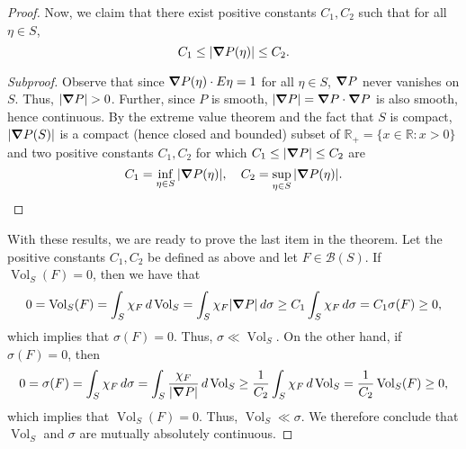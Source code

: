 \documentclass[11pt]{article}
\newcommand*{\myproofname}{Proof}
\newenvironment{subproof}[1][\myproofname]{\begin{proof}[#1]\renewcommand*{\qedsymbol}{$\mathbin{/\mkern-6mu/}$}}{\end{proof}}
\newcommand\R{\mathbb{R}}
\newcommand{\f}[2]{\frac{#1}{#2}}
\newcommand{\Vol}{\operatorname{Vol}}
\begin{document}
\begin{proof}
Now, we claim that there exist positive constants $C_1, C_2$ such that for all $\eta\in S$, 
\begin{equation*}
    C_1 \leq \abs{\grad P(\eta)} \leq C_2.
\end{equation*}
\begin{subproof}[Subproof]
Observe that since $\grad P(\eta) \cdot E\eta = 1$ for all $\eta\in S$, $\grad P$ never vanishes on $S$. Thus, $\abs{\grad P} > 0$. Further, since $P$ is smooth, $\abs{\grad P} = \grad P \cdot \grad P$ is also smooth, hence continuous. By the extreme value theorem and the fact that $S$ is compact, $\abs{\grad P(S) }$ is a compact (hence closed and bounded) subset of $\R_+ = \{ x \in \R : x > 0 \}$ and two positive constants $C_1,C_2$ for which $C_1 \leq \abs{\grad P} \leq C_2$ are
\begin{equation*}
    C_1 = \inf_{\eta\in S}\abs{\grad P(\eta) }, \quad C_2 = \sup_{\eta\in S}\abs{\grad P(\eta) }.
\end{equation*}
\end{subproof}

With these results, we are ready to prove the last item in the theorem. Let the positive constants $C_1,C_2$ be defined as above and let $F\in \mathcal{B}(S)$. If $\Vol_S(F) = 0$, then we have that
\begin{equation*}
    0 = \Vol_S(F) = \int_S \chi_F \,d\Vol_S = \int_S \chi_F \abs{\grad P }\,d\sigma \geq C_1 \int_S \chi_F \,d\sigma = C_1 \sigma(F) \geq 0,
\end{equation*}
which implies that $\sigma(F) = 0$. Thus, $\sigma \ll \Vol_S$. On the other hand, if $\sigma(F) = 0$, then
\begin{equation*}
    0 = \sigma(F) = \int_S \chi_F \,d\sigma= \int_S \frac{\chi_F }{ \abs{\grad P } }\,d\Vol_S \geq \f{1}{C_2} \int_S \chi_F \,d\Vol_S = \f{1}{C_2} \Vol_S(F) \geq 0,
\end{equation*}
which implies that $\Vol_S(F) = 0$. Thus, $\Vol_S \ll \sigma$. We therefore conclude that $\Vol_S$ and $\sigma$ are mutually absolutely continuous.










\end{proof}
\end{document}
